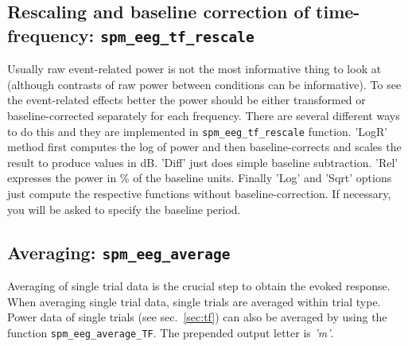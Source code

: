 \subsection{Rescaling and baseline correction of time-frequency: \texttt{spm\_eeg\_tf\_rescale}\label{sec:tfrescale}}
Usually raw event-related power is not the most informative thing to look at (although contrasts of raw power between conditions can be informative). To see the event-related effects better the power should be either transformed or baseline-corrected separately for each frequency. There are several different ways to do this and they are implemented in \texttt{spm\_eeg\_tf\_rescale} function. 'LogR' method first computes the log of power and then baseline-corrects and scales the result to produce values in dB. 'Diff' just does simple baseline subtraction. 'Rel' expresses the power in \% of the baseline units. Finally 'Log' and 'Sqrt' options just compute the respective functions without baseline-correction. If necessary, you will be asked to specify the baseline period.

\subsection{Averaging: \texttt{spm\_eeg\_average}}
Averaging of single trial data is the crucial step to obtain the evoked response. When averaging single trial data, single trials are averaged within trial type. Power data of single trials (see sec.~\ref{sec:tf}) can also be averaged by using the function \texttt{spm\_eeg\_average\_TF}. The prepended output letter is \textit{'m'}.

